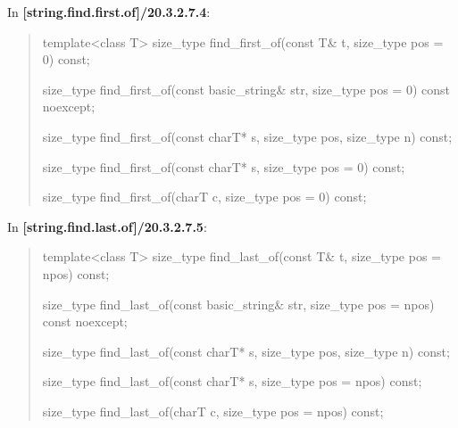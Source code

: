 \documentclass{wg21}
\begin{document}
In \textbf{[string.find.first.of]/20.3.2.7.4}:
\begin{quote}
\begin{itemdecl}
template<class T>
  size_type find_first_of(const T& t, size_type pos = 0) const;
\end{itemdecl}

\begin{itemdecl}
size_type find_first_of(const basic_string& str, size_type pos = 0) const noexcept;
\end{itemdecl}

\begin{itemdecl}
size_type find_first_of(const charT* s, size_type pos, size_type n) const;
\end{itemdecl}

\begin{itemdecl}
size_type find_first_of(const charT* s, size_type pos = 0) const;
\end{itemdecl}

\begin{itemdecl}
size_type find_first_of(charT c, size_type pos = 0) const;
\end{itemdecl}
\end{quote}


In \textbf{[string.find.last.of]/20.3.2.7.5}:
\begin{quote}
\begin{itemdecl}
template<class T>
  size_type find_last_of(const T& t, size_type pos = npos) const;
\end{itemdecl}

\begin{itemdecl}
size_type find_last_of(const basic_string& str, size_type pos = npos) const noexcept;
\end{itemdecl}

\begin{itemdecl}
size_type find_last_of(const charT* s, size_type pos, size_type n) const;
\end{itemdecl}

\begin{itemdecl}
size_type find_last_of(const charT* s, size_type pos = npos) const;
\end{itemdecl}

\begin{itemdecl}
size_type find_last_of(charT c, size_type pos = npos) const;
\end{itemdecl}
\end{quote}
\end{document}
